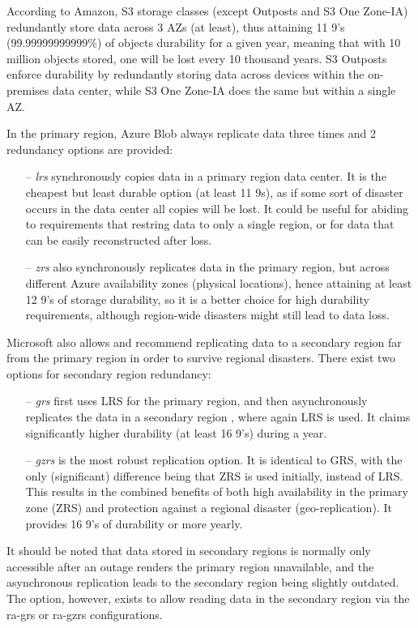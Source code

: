 According to Amazon, S3 storage classes (except Outposts and S3 One Zone-IA) redundantly store data across 3 AZs (at least), thus attaining 11 9's (99.99999999999\%) of objects durability for a given year, meaning that with 10 million objects stored, one will be lost every 10 thousand years. S3 Outposts enforce durability by redundantly storing data across devices within the on-premises data center, while S3 One Zone-IA does the same but within a single AZ.

\bigskip
In the primary region, Azure Blob always replicate data three times and 2 redundancy options are provided:~\cite{blobinfo}
\begin{itemize}
    \item [--] \textit{\ac{lrs}} synchronously copies data in a primary region data center. It is the cheapest but least durable option (at least 11 9s), as if some sort of disaster occurs in the data center all copies will be lost. It could be useful for abiding to requirements that restring data to only a single region, or for data that can be easily reconstructed after loss.

    \item[--] \textit{\ac{zrs}} also synchronously replicates data in the primary region, but across different Azure availability zones (physical locations), hence attaining at least 12 9's of storage durability, so it is a better choice for high durability requirements, although region-wide disasters might still lead to data loss.
\end{itemize}

Microsoft also allows and recommend replicating data to a secondary region far from the primary region in order to survive regional disasters. There exist two options for secondary region redundancy:
\begin{itemize}
    \item [--]  \textit{\ac{grs}} first uses LRS for the primary region, and then asynchronously replicates the data in a secondary region , where again LRS is used. It claims significantly higher durability (at least 16 9's) during a year.

    \item [--] \textit{\ac{gzrs}} is the most robust replication option. It is identical to GRS, with the only (significant) difference being that ZRS is used initially, instead of LRS. This results in the combined benefits of both high availability in the primary zone (ZRS) and protection against a regional disaster (geo-replication). It provides 16 9's of durability or more yearly.
\end{itemize}
It should be noted that data stored in secondary regions is normally only accessible after an outage renders the primary region unavailable, and the asynchronous replication leads to the secondary region being slightly outdated. The option, however, exists to allow reading data in the secondary region via the \ac{ra-grs} or \ac{ra-gzrs} configurations.

